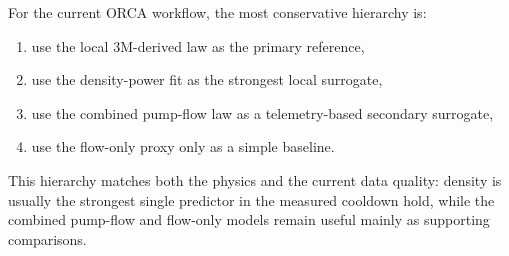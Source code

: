 \documentclass[11pt]{article}
\begin{document}
For the current ORCA workflow, the most conservative hierarchy is:
\begin{enumerate}
    \item use the local 3M-derived law as the primary reference,
    \item use the density-power fit as the strongest local surrogate,
    \item use the combined pump-flow law as a telemetry-based secondary surrogate,
    \item use the flow-only proxy only as a simple baseline.
\end{enumerate}

This hierarchy matches both the physics and the current data quality: density
is usually the strongest single predictor in the measured cooldown hold, while
the combined pump-flow and flow-only models remain useful mainly as supporting
comparisons.
\end{document}

